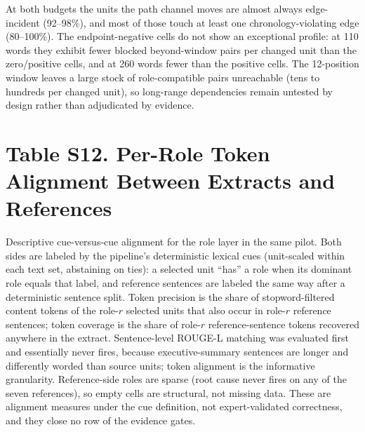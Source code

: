 \documentclass[11pt]{article}
\begin{document}
\begin{center}
\small
{}
\end{center}

At both budgets the units the path channel moves are almost always edge-incident (92--98\%), and most of those touch at least one chronology-violating edge (80--100\%). The endpoint-negative cells do not show an exceptional profile: at 110 words they exhibit fewer blocked beyond-window pairs per changed unit than the zero/positive cells, and at 260 words fewer than the positive cells. The 12-position window leaves a large stock of role-compatible pairs unreachable (tens to hundreds per changed unit), so long-range dependencies remain untested by design rather than adjudicated by evidence.

\section*{Table S12. Per-Role Token Alignment Between Extracts and References}

Descriptive cue-versus-cue alignment for the role layer in the same pilot. Both sides are labeled by the pipeline's deterministic lexical cues (unit-scaled within each text set, abstaining on ties): a selected unit ``has'' a role when its dominant role equals that label, and reference sentences are labeled the same way after a deterministic sentence split. Token precision is the share of stopword-filtered content tokens of the role-$r$ selected units that also occur in role-$r$ reference sentences; token coverage is the share of role-$r$ reference-sentence tokens recovered anywhere in the extract. Sentence-level ROUGE-L matching was evaluated first and essentially never fires, because executive-summary sentences are longer and differently worded than source units; token alignment is the informative granularity. Reference-side roles are sparse (root cause never fires on any of the seven references), so empty cells are structural, not missing data. These are alignment measures under the cue definition, not expert-validated correctness, and they close no row of the evidence gates.
\end{document}
